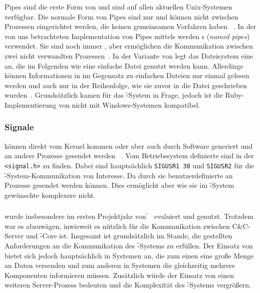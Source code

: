Pipes sind die erste Form von  und sind auf allen aktuellen
Unix-Systemen verfügbar. Die normale Form von Pipes sind nur 
und können nicht zwischen Prozessen eingerichtet werden, die keinen
gemeinsamen Vorfahren haben ~\cite[718]{Herolds}. In der von uns betrachteten
Implementation von Pipes mittels  werden s
(\textit{named pipes}) verwendet. Sie sind noch immer , aber
ermöglichen die Kommunikation zwischen zwei nicht verwandten 
Prozessen~\cite[744]{Herolds}. In der Variante von  legt
das Dateisystem eine  an, die im Folgenden wie eine einfache Datei
genutzt werden kann. Allerdings können Informationen in  im Gegensatz
zu einfachen Dateien nur einmal gelesen werden und auch nur in der Reihenfolge,
wie sie zuvor in die Datei geschrieben wurden~\cite[265]{Herolds}. Grundsätzlich 
kamen  für das \f-System in Frage, jedoch ist die Ruby-Implementierung von
 nicht mit Windows-Systemen kompatibel.

\subsubsection*{Signale}

 können direkt vom Kernel kommen oder aber auch durch
Software generiert und an andere Prozesse gesendet werden
~\cite[599-630]{Herolds}. Vom Betriebssystem definierte  sind
in der \texttt{<signal.h>} zu finden. Dabei sind hauptsächlich \texttt{SIGUSR1 30}
und \texttt{SIGUSR2} für die \f-System-Kommunikation von Interesse. Da
durch sie benutzerdefinierte  an Prozesse gesendet werden
können. Dies ermöglicht aber wie sie im \f-System gewünschte komplexere
 nicht.

\subsubsection*{}
\label{subsec:amqp}

 wurde insbesondere im ersten Projektjahr von
\f~\cite[Kapitel~3.7, S.\,163]{fidius} evaluiert und
genutzt. Trotzdem war es abzuwägen, inwieweit es nützlich für die
Kommunikation zwischen C\&C-Server und \f-Core ist. Insgesamt ist
 grundsätzlich im Stande, die gestellten Anforderungen an
die Kommunikation des \f-Systems zu erfüllen. Der Einsatz von
 bietet sich jedoch hauptsächlich in Systemen an, die zum
einen eine große Menge an Daten versenden und zum anderen in Systemen
die gleichzeitig mehrere Komponenten informieren müssen. Zusätzlich
würde der Einsatz von  einen weiteren Server-Prozess
bedeuten und die Komplexität des \f-Systems vergrößern.

